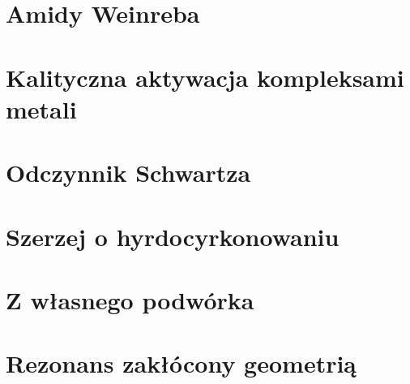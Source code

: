 \section{Amidy Weinreba}


\section{Kalityczna aktywacja kompleksami metali}

\section{Odczynnik Schwartza}

\section{Szerzej o hyrdocyrkonowaniu}

\section{Z własnego podwórka}

\section{Rezonans zakłócony geometrią}